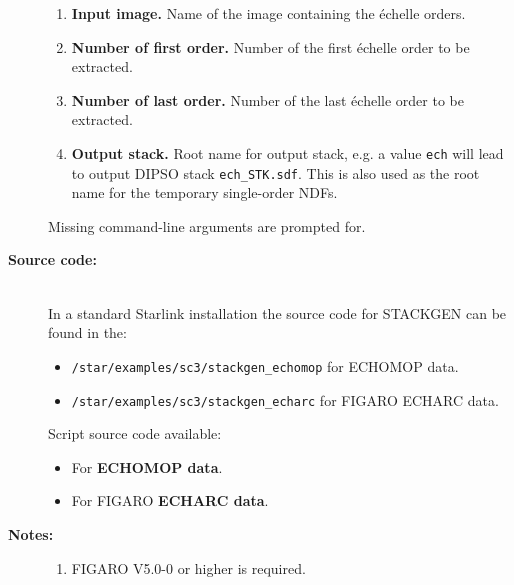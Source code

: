 \documentclass[twoside,11pt]{article}
\newenvironment{latexonly}{}{}
\newcommand{\htmlref}[2]{#1}
\newcommand{\xref}[3]{#1}
\begin{document}
\begin{description}
\begin{enumerate}
\item {\bf Input image.}
      Name of the image containing the \'{e}chelle orders.

\item {\bf Number of first order.}
      Number of the first \'{e}chelle order to be extracted.

\item {\bf Number of last order.}
      Number of the last \'{e}chelle order to be extracted.

\item {\bf Output stack.}
      Root name for output stack, e.g. a value \verb+ech+ will
      lead to output DIPSO stack {\tt ech\_STK.sdf}.  This is also used
      as the root name for the temporary single-order NDFs.

\end{enumerate}

     Missing command-line arguments are prompted for.

\item [{\bf Source code:}] \mbox{} \\
\begin{latexonly}
In a standard Starlink installation the source code for STACKGEN can be found
in the:
\begin{itemize}

\item {\tt /star/examples/sc3/stackgen\_echomop} for ECHOMOP data.

\item {\tt /star/examples/sc3/stackgen\_echarc} for FIGARO ECHARC data.

\end{itemize}
\end{latexonly}
\begin{htmlonly}
      Script source code available:
\begin{itemize}

\item For \htmlref{{\bf ECHOMOP data}}{se_stackgen_echomop_source}.

\item For FIGARO \htmlref{{\bf ECHARC data}}{se_stackgen_echarc_source}.

\end{itemize}
\end{htmlonly}

\item [{\bf Notes:}] \mbox{}
\begin{enumerate}

\item \xref{FIGARO}{sun86}{} V5.0-0 or higher is required.


\end{enumerate}
\end{description}
\end{document}
